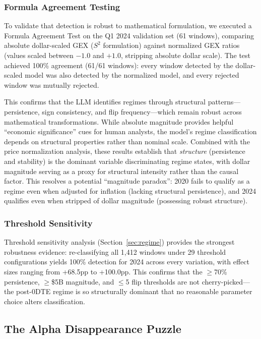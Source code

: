 \subsubsection{Formula Agreement Testing}

To validate that detection is robust to mathematical formulation, we executed a Formula Agreement Test on the Q1 2024 validation set (61 windows), comparing absolute dollar-scaled GEX ($S^2$ formulation) against normalized GEX ratios (values scaled between $-1.0$ and $+1.0$, stripping absolute dollar scale). The test achieved 100\% agreement (61/61 windows): every window detected by the dollar-scaled model was also detected by the normalized model, and every rejected window was mutually rejected.

This confirms that the LLM identifies regimes through structural patterns---persistence, sign consistency, and flip frequency---which remain robust across mathematical transformations. While absolute magnitude provides helpful ``economic significance'' cues for human analysts, the model's regime classification depends on structural properties rather than nominal scale. Combined with the price normalization analysis, these results establish that \textit{structure} (persistence and stability) is the dominant variable discriminating regime states, with dollar magnitude serving as a proxy for structural intensity rather than the causal factor. This resolves a potential ``magnitude paradox'': 2020 fails to qualify as a regime even when adjusted for inflation (lacking structural persistence), and 2024 qualifies even when stripped of dollar magnitude (possessing robust structure).

\subsubsection{Threshold Sensitivity}

Threshold sensitivity analysis (Section~\ref{sec:regime}) provides the strongest robustness evidence: re-classifying all 1,412 windows under 29 threshold configurations yields 100\% detection for 2024 across every variation, with effect sizes ranging from +68.5pp to +100.0pp. This confirms that the $\geq$70\% persistence, $\geq$\$5B magnitude, and $\leq$5 flip thresholds are not cherry-picked---the post-0DTE regime is so structurally dominant that no reasonable parameter choice alters classification.

\subsection{The Alpha Disappearance Puzzle}

